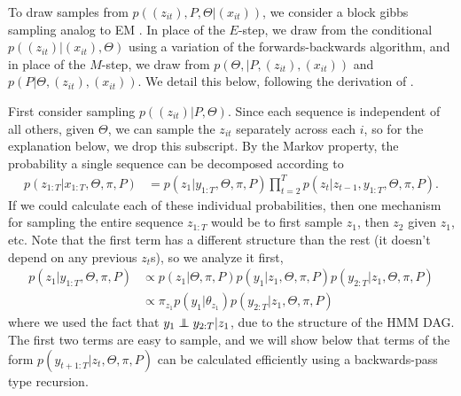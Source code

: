 \documentclass[14pt]{extreport}
\begin{document}
To draw samples from $p\left(\left(z_{it}\right), P, \Theta \vert
\left(x_{it}\right)\right)$, we consider a block gibbs sampling analog to EM
\citep{fruhwirth2006finite}. In place of the $E$-step, we draw from the
conditional $p\left(\left(z_{it}\right) \vert \left(x_{it}\right),
\Theta\right)$ using a variation of the forwards-backwards algorithm, and in
place of the $M$-step, we draw from $p\left(\Theta, \vert P, \left(z_{it}\right),
\left(x_{it}\right)\right)$ and $p\left(P \vert \Theta, \left(z_{it}\right),
\left(x_{it}\right)\right)$. We detail this below, following the derivation of
\citep{fox2009bayesian}.

First consider sampling $p\left(\left(z_{it}\right) \vert P, \Theta\right)$.
Since each sequence is independent of all others, given $\Theta$, we can sample
the $z_{it}$ separately across each $i$, so for the explanation below, we drop
this subscript. By the Markov property, the probability a single sequence can be
decomposed according to
\begin{align}
  \label{eq:sticky_block_z}
p\left(z_{1:T} \vert x_{1:T}, \Theta, \pi, P\right) &= p\left(z_{1} \vert y_{1:T}, \Theta, \pi, P\right) \prod_{t = 2}^{T} p\left(z_{t} \vert z_{t - 1}, y_{1:T}, \Theta, \pi, P\right).
\end{align}
If we could calculate each of these individual probabilities, then one mechanism
for sampling the entire sequence $z_{1:T}$ would be to first sample $z_{1}$,
then $z_{2}$ given $z_{1}$, etc. Note that the first term has a different
structure than the rest (it doesn't depend on any previous $z_{t}$s), so we
analyze it first,
\begin{align*}
  p\left(z_{1} \vert y_{1:T}, \Theta, \pi, P\right) &\propto p\left(z_{1} \vert \Theta, \pi, P\right) p\left(y_{1} \vert z_{1}, \Theta, \pi, P\right) p\left(y_{2:T} \vert z_{1}, \Theta, \pi, P\right) \\
  &\propto \pi_{z_{1}} p\left(y_{1} \vert \theta_{z_{1}}\right) p\left(y_{2:T} \vert z_{1}, \Theta, \pi, P\right)
\end{align*}
where we used the fact that $y_{1} \independent y_{2:T} \vert z_{1}$, due to the
structure of the HMM DAG. The first two terms are easy to sample, and we will
show below that terms of the form $p\left(y_{t + 1:T} \vert z_{t}, \Theta, \pi,
P\right)$ can be calculated efficiently using a backwards-pass type recursion.
\end{document}
